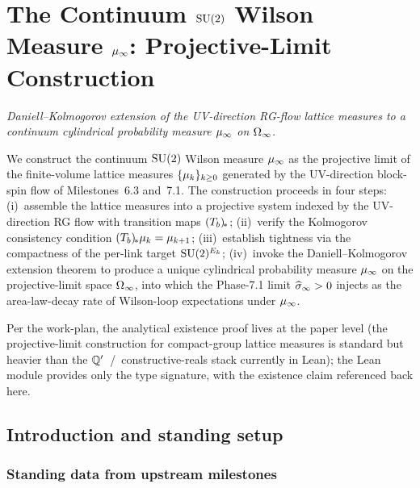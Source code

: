 %

\chapter{The Continuum
  \texorpdfstring{$\mathrm{SU}(2)$}{SU(2)} Wilson Measure
  \texorpdfstring{$\mu_\infty$}{mu\_infinity}:
  Projective-Limit Construction}
\label{ch:continuum-measure}

\noindent\emph{Daniell--Kolmogorov extension of the UV-direction
RG-flow lattice measures to a continuum cylindrical probability
measure $\mu_\infty$ on $\Omega_\infty$.}

We construct the continuum $\mathrm{SU}(2)$ Wilson measure $\mu_\infty$ as the
projective limit of the finite-volume lattice measures
$\{\mu_k\}_{k \ge 0}$ generated by the UV-direction block-spin flow
of Milestones~6.3 and~7.1.  The construction proceeds in four steps:
(i)~assemble the lattice measures into a projective system indexed
by the UV-direction RG flow with transition maps $(T_b)_{\!*}$;
(ii)~verify the Kolmogorov consistency condition $(T_b)_{\!*} \mu_k =
\mu_{k+1}$; (iii)~establish tightness via the compactness of the
per-link target $\mathrm{SU}(2)^{E_k}$; (iv)~invoke the Daniell--Kolmogorov
extension theorem to produce a unique cylindrical probability measure
$\mu_\infty$ on the projective-limit space $\Omega_\infty$, into which the
Phase-7.1 limit $\widehat{\sigma}_\infty > 0$ injects as the area-law-decay rate of
Wilson-loop expectations under $\mu_\infty$.

Per
the work-plan, the analytical existence proof lives at the paper
level (the projective-limit construction for compact-group lattice
measures is standard but heavier than the $\mathbb{Q}'$~/~constructive-reals
stack currently in Lean); the Lean module
 provides only
the type signature, with the existence claim referenced back here.

\section{Introduction and standing setup}
\label{sec:continuum-intro}

\subsection{Standing data from upstream milestones}
\label{subsec:upstream}

